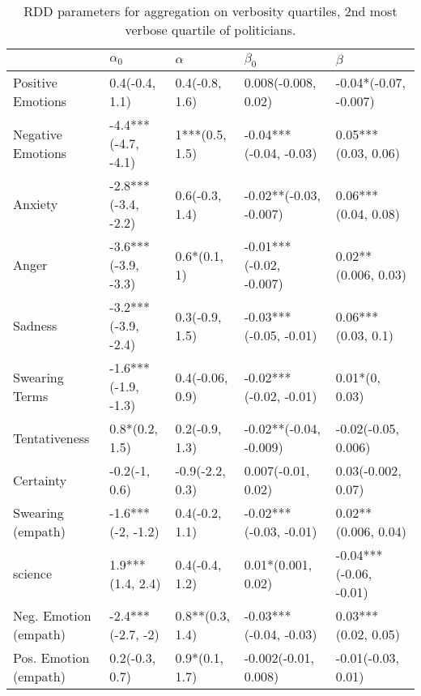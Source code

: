 \begin{table}[h]\centering
\begin{adjustbox}{width=\linewidth, center}
	\begin{tabular}{lllll}
	\toprule
	{} &           $\alpha_0$ &         $\alpha$ &                $\beta_0$ &                 $\beta$ \\
	\midrule
	Positive Emotions     &       0.4(-0.4, 1.1) &   0.4(-0.8, 1.6) &      0.008(-0.008, 0.02) &   -0.04*(-0.07, -0.007) \\
	Negative Emotions     &  -4.4***(-4.7, -4.1) &   1***(0.5, 1.5) &   -0.04***(-0.04, -0.03) &     0.05***(0.03, 0.06) \\
	Anxiety               &  -2.8***(-3.4, -2.2) &   0.6(-0.3, 1.4) &   -0.02**(-0.03, -0.007) &     0.06***(0.04, 0.08) \\
	Anger                 &  -3.6***(-3.9, -3.3) &     0.6*(0.1, 1) &  -0.01***(-0.02, -0.007) &     0.02**(0.006, 0.03) \\
	Sadness               &  -3.2***(-3.9, -2.4) &   0.3(-0.9, 1.5) &   -0.03***(-0.05, -0.01) &      0.06***(0.03, 0.1) \\
	Swearing Terms        &  -1.6***(-1.9, -1.3) &  0.4(-0.06, 0.9) &   -0.02***(-0.02, -0.01) &          0.01*(0, 0.03) \\
	Tentativeness         &       0.8*(0.2, 1.5) &   0.2(-0.9, 1.3) &   -0.02**(-0.04, -0.009) &     -0.02(-0.05, 0.006) \\
	Certainty             &        -0.2(-1, 0.6) &  -0.9(-2.2, 0.3) &       0.007(-0.01, 0.02) &      0.03(-0.002, 0.07) \\
	Swearing (empath)     &    -1.6***(-2, -1.2) &   0.4(-0.2, 1.1) &   -0.02***(-0.03, -0.01) &     0.02**(0.006, 0.04) \\
	science               &     1.9***(1.4, 2.4) &   0.4(-0.4, 1.2) &       0.01*(0.001, 0.02) &  -0.04***(-0.06, -0.01) \\
	Neg. Emotion (empath) &    -2.4***(-2.7, -2) &  0.8**(0.3, 1.4) &   -0.03***(-0.04, -0.03) &     0.03***(0.02, 0.05) \\
	Pos. Emotion (empath) &       0.2(-0.3, 0.7) &   0.9*(0.1, 1.7) &     -0.002(-0.01, 0.008) &      -0.01(-0.03, 0.01) \\
	\bottomrule
	\end{tabular}
	
\end{adjustbox}
	\caption{RDD parameters for aggregation on verbosity quartiles, 2nd most verbose quartile of politicians.}
	\label{fig: Verbosity_3}
\end{table}

